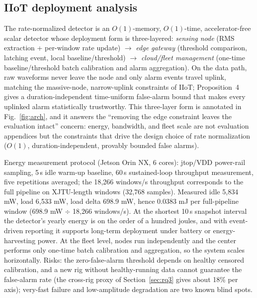 \documentclass[journal]{IEEEtran}
\begin{document}
\subsection{IIoT deployment analysis}\label{sec:deploy}
The rate-normalized detector is an $O(1)$-memory, $O(1)$-time, accelerator-free scalar detector whose deployment form is three-layered: \emph{sensing node} (RMS extraction + per-window rate update) $\to$ \emph{edge gateway} (threshold comparison, latching event, local baseline/threshold) $\to$ \emph{cloud/fleet management} (one-time baseline/threshold batch calibration and alarm aggregation). On the data path, raw waveforms never leave the node and only alarm events travel uplink, matching the massive-node, narrow-uplink constraints of IIoT; Proposition~4 gives a duration-independent time-uniform false-alarm bound that makes every uplinked alarm statistically trustworthy. This three-layer form is annotated in Fig.~\ref{fig:arch}, and it answers the ``removing the edge constraint leaves the evaluation intact'' concern: energy, bandwidth, and fleet scale are not evaluation appendices but the constraints that drive the design choice of rate normalization ($O(1)$, duration-independent, provably bounded false alarms).

Energy measurement protocol (Jetson Orin NX, 6 cores): jtop/VDD power-rail sampling, 5\,s idle warm-up baseline, 60\,s sustained-loop throughput measurement, five repetitions averaged; the 18{,}266 windows/s throughput corresponds to the full pipeline on XJTU-length windows (32{,}768 samples). Measured idle 5{,}834 mW, load 6{,}533 mW, load delta 698.9 mW, hence 0.0383 mJ per full-pipeline window (698.9 mW $\div$ 18{,}266 windows/s). At the shortest 10\,s snapshot interval the detector's yearly energy is on the order of a hundred joules, and with event-driven reporting it supports long-term deployment under battery or energy-harvesting power. At the fleet level, nodes run independently and the center performs only one-time batch calibration and aggregation, so the system scales horizontally. Risks: the zero-false-alarm threshold depends on healthy censored calibration, and a new rig without healthy-running data cannot guarantee the false-alarm rate (the cross-rig proxy of Section~\ref{sec:rq3} gives about 18\% per axis); very-fast failure and low-amplitude degradation are two known blind spots.
\end{document}

